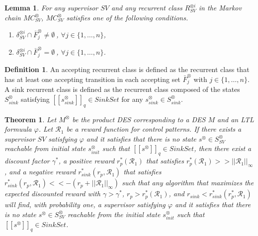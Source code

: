 \documentclass[10pt]{article}
\newtheorem{theorem}{Theorem}
\newtheorem{lemma}{Lemma}
\theoremstyle{definition}
\newtheorem{definition}{Definition}
\newcommand{\myspq}{\ensuremath{[\![s^{\otimes}]\!]}_q}
\newcommand{\myspqsink}{\ensuremath{[\![s^{\otimes}_{sink}]\!]}_q}
\begin{document}
\begin{lemma}
  For any supervisor $SV$ and any recurrent class $R^{\otimes i}_{SV}$ in the Markov chain $MC^{\otimes}_{SV}$,
  $MC^{\otimes}_{SV}$ satisfies one of the following conditions.
  \vspace{2mm}
  \begin{enumerate}
    \item $\delta^{\otimes i}_{SV} \cap \bar{F}^{\otimes}_j \neq \emptyset\ $, $ \forall j \in \{ 1, \ldots ,n \}$,
    \item $\delta^{\otimes i}_{SV} \cap \bar{F}^{\otimes}_j = \emptyset\ $, $ \forall j \in \{ 1, \ldots ,n \}$.
  \end{enumerate}
  \label{lemma3-1}
\end{lemma}

\begin{definition}
  An accepting recurrent class is defined as the recurrent class that has at least one accepting transition in each accepting set $\bar{F}^{\otimes}_j$ with $j \in \{ 1, \ldots, n \}$. A sink recurrent class is defined as the recurrent class composed of the states $S^{\otimes}_{sink}$ satisfying $\myspqsink \in SinkSet$ for any $s^{\otimes}_{sink} \in S^{\otimes}_{sink}$.
\end{definition}

\begin{theorem}
  Let $M^{\otimes}$ be the product DES corresponding to a DES $M$ and an LTL formuula $\varphi$. Let $\mathcal{R}_1$ be a reward function for control patterns. %
  If there exists a supervisor $SV$ satisfying $\varphi$ and it satisfies that there is no state $s^{\otimes} \in S^{\otimes}_{SV}$ reachable from initial state $s^{\otimes}_{init}$ such that $\myspq \in SinkSet$, then there exist a discount factor $\gamma^{\ast}$, a positive reward $r^{\ast}_p(\mathcal{R}_1)$ that satisfies $ r^{\ast}_p(\mathcal{R}_1) >> ||\mathcal{R}_1||_{\infty}$, and a negative reward $r^{\ast}_{sink}(r_p, \mathcal{R}_1)$ that satisfies $r^{\ast}_{sink}(r_p, \mathcal{R}_1) << - (r_p + ||\mathcal{R}_1||_{\infty}) $ such that any algorithm that maximizes the expected discounted reward with $\gamma > \gamma^{\ast}$, $r_p > r^{\ast}_p(\mathcal{R}_1)$, and $r_{sink} < r^{\ast}_{sink}(r^{\ast}_p, \mathcal{R}_1)$ will find, with probability one, a supervisor satisfying $\varphi$ and it satisfies that there is no state $s^{\otimes} \in S^{\otimes}_{SV}$ reachable from the initial state $s^{\otimes}_{init}$ such that $\myspq \in SinkSet$.
\end{theorem}
\end{document}
